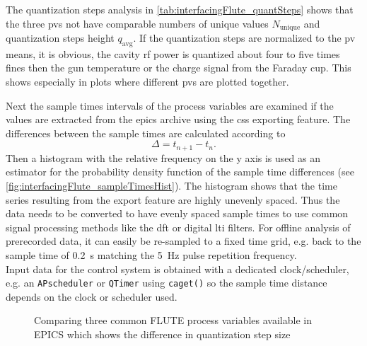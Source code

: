 The quantization steps analysis in \autoref{tab:interfacingFlute_quantSteps} shows that the three \glspl{pv} not have comparable numbers of unique values $N_\text{unique}$ and quantization steps height $q_\text{avg}$. If the quantization steps are normalized to the \gls{pv} means, it is obvious, the cavity \gls{rf} power is quantized about four to five times fines then the gun temperature or the charge signal from the Faraday cup. This shows especially in plots where different \glspl{pv} are plotted together.

Next the sample times intervals of the process variables are examined if the values are extracted from the \gls{epics} archive using the \gls{css} exporting feature. The differences between the sample times are calculated according to
\begin{equation}
\Delta=t_{n+1}-t_n.
\end{equation}
Then a histogram with the relative frequency on the y axis is used as an estimator for the probability density function of the sample time differences (see \autoref{fig:interfacingFlute_sampleTimesHist}). The histogram shows that the time series resulting from the export feature are highly unevenly spaced. Thus the data needs to be converted to have evenly spaced sample times to use common signal processing methods like the \gls{dft} or digital \gls{lti} filters. For offline analysis of prerecorded data, it can easily be re-sampled to a fixed time grid, e.g. back to the sample time of \SI{0.2}{\second} matching the \SI{5}{\hertz} pulse repetition frequency.\\
Input data for the control system is obtained with a dedicated clock/scheduler, e.g. an \texttt{APscheduler} or \texttt{QTimer} using \texttt{caget()} so the sample time distance depends on the clock or scheduler used.

\begin{figure}[H]
\centering
		\hfill
        
        \hfill
        
        \hfill
       \caption[Comparing three common FLUTE process variables available in EPICS]{Comparing three common FLUTE process variables available in EPICS which shows the difference in quantization step size}
    \label{fig:quantNoise}
\end{figure}

